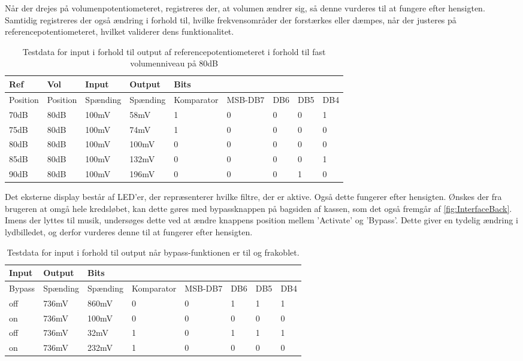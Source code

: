 Når der drejes på volumenpotentiometeret, registreres der, at volumen ændrer sig, så denne vurderes til at fungere efter hensigten.
Samtidig registreres der også ændring i forhold til, hvilke frekvensområder der forstærkes eller dæmpes, når der justeres på referencepotentiometeret, hvilket validerer dens funktionalitet.
%
\begin{table}[H]
\centering
\begin{tabular}{|l|l|l|l|l|l|l|l|l|}
\hline
Ref & Vol & Input & Output & Bits &  &  &  &  \\ \hline
Position & Position & Spænding & Spænding & Komparator & MSB-DB7 & DB6 & DB5 & DB4 \\ \hline
70dB & 80dB & 100mV & 58mV & 1 & 0 & 0 & 0 & 1 \\ \hline
75dB & 80dB & 100mV & 74mV & 1 & 0 & 0 & 0 & 0 \\ \hline
80dB & 80dB & 100mV & 100mV & 0 & 0 & 0 & 0 & 0 \\ \hline
85dB & 80dB & 100mV & 132mV & 0 & 0 & 0 & 0 & 1 \\ \hline
90dB & 80dB & 100mV & 196mV & 0 & 0 & 0 & 1 & 0 \\ \hline
\end{tabular}
\caption{Testdata for input i forhold til output af referencepotentiometeret i forhold til fast volumenniveau på 80dB}
\label{Accepttest }
\end{table}
\noindent
Det eksterne display består af LED'er, der repræsenterer hvilke filtre, der er aktive. Også dette fungerer efter hensigten. Ønskes der fra brugeren at omgå hele kredsløbet, kan dette gøres med bypassknappen på bagsiden af kassen, som det også fremgår af \autoref{fig:InterfaceBack}. Imens der lyttes til musik, undersøges dette ved at ændre knappens position mellem 'Activate' og 'Bypass'. Dette giver en tydelig ændring i lydbilledet, og derfor vurderes denne til at fungerer efter hensigten.
\begin{table}[H]
\centering
\begin{tabular}{|l|l|l|l|l|l|l|l|}
\hline
Input & Output & Bits &  &  &  &  &  \\ \hline
Bypass & Spænding & Spænding & Komparator & MSB-DB7 & DB6 & DB5 & DB4 \\ \hline
off & 736mV & 860mV & 0 & 0 & 1 & 1 & 1 \\ \hline
on & 736mV & 100mV & 0 & 0 & 0 & 0 & 0 \\ \hline
off & 736mV & 32mV & 1 & 0 & 1 & 1 & 1 \\ \hline
on & 736mV & 232mV & 1 & 0 & 0 & 0 & 0 \\ \hline
\end{tabular}
\caption{Testdata for input i forhold til output når bypass-funktionen er til og frakoblet.}
\label{my-label}
\end{table}
%
\newpage
\noindent



